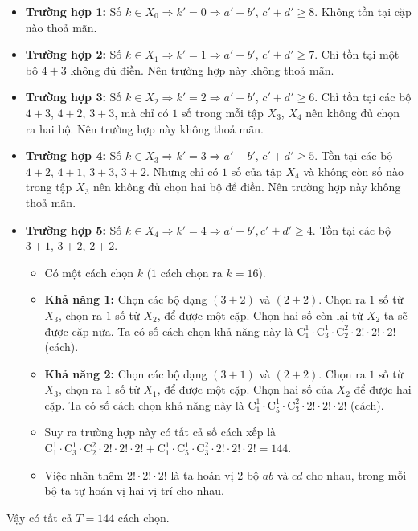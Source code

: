 \begin{ex}
{		\begin{itemize}
			\item \textbf{Trường hợp 1:} Số $k \in X_0 \Rightarrow k'=0 \Rightarrow a'+b'$, $c'+d' \ge 8$. Không tồn tại cặp nào thoả mãn.
			\item \textbf{Trường hợp 2:} Số $k \in X_1 \Rightarrow k'=1 \Rightarrow a'+b'$, $c'+d' \ge 7$. Chỉ tồn tại một bộ $4+3$ không đủ điền. Nên trường hợp này không thoả mãn.
			\item \textbf{Trường hợp 3:} Số $k \in X_2 \Rightarrow k'=2 \Rightarrow a'+b'$, $c'+d' \ge 6$. Chỉ tồn tại các bộ $4+3$, $4+2$, $3+3$, mà chỉ có $1$ số trong mỗi tập $X_3$, $X_4$ nên không đủ chọn ra hai bộ. Nên trường hợp này không thoả mãn.
			\item \textbf{Trường hợp 4:} Số $k \in X_3 \Rightarrow k'=3 \Rightarrow a'+b'$, $c'+d' \ge 5$. Tồn tại các bộ $4+2$, $4+1$, $3+3$, $3+2$. Nhưng chỉ có $1$ số của tập $X_4$ và không còn số nào trong tập $X_3$ nên không đủ chọn hai bộ để điền. Nên trường hợp này không thoả mãn.
			\item \textbf{Trường hợp 5:} Số $k \in X_4 \Rightarrow k'=4 \Rightarrow a'+b', c'+d' \ge 4$. Tồn tại các bộ $3+1$, $3+2$, $2+2$.
			\begin{itemize}
				\item Có một cách chọn $k$ ($1$ cách chọn ra $k=16$).
				\item \textbf{Khả năng 1:} Chọn các bộ dạng $(3+2)$ và $(2+2)$. Chọn ra $1$ số từ $X_3$, chọn ra $1$ số từ $X_2$, để được một cặp. Chọn hai số còn lại từ $X_2$ ta sẽ được cặp nữa. Ta có số cách chọn khả năng này là $\mathrm{C}_1^1 \cdot \mathrm{C}_3^1 \cdot \mathrm{C}_2^2 \cdot 2! \cdot 2! \cdot 2!$ (cách).
				\item \textbf{Khả năng 2:} Chọn các bộ dạng $(3+1)$ và $(2+2)$. Chọn ra $1$ số từ $X_3$, chọn ra $1$ số từ $X_1$, để được một cặp. Chọn hai số của $X_2$ để được hai cặp. Ta có số cách chọn khả năng này là $\mathrm{C}_1^1 \cdot \mathrm{C}_5^1 \cdot \mathrm{C}_3^2 \cdot 2! \cdot 2! \cdot 2!$ (cách).
				\item Suy ra trường hợp này có tất cả số cách xếp là $\mathrm{C}_1^1 \cdot \mathrm{C}_3^1 \cdot \mathrm{C}_2^2 \cdot 2! \cdot 2! \cdot 2! + \mathrm{C}_1^1 \cdot \mathrm{C}_5^1 \cdot \mathrm{C}_3^2 \cdot 2! \cdot 2! \cdot 2! = 144$.
				\item Việc nhân thêm $2! \cdot 2! \cdot 2!$ là ta hoán vị $2$ bộ $ab$ và $cd$ cho nhau, trong mỗi bộ ta tự hoán vị hai vị trí cho nhau.
			\end{itemize}
		\end{itemize}
		Vậy có tất cả $T = 144$ cách chọn.
	}
\end{ex}

\newpage
{}
\label{B\thedeso}